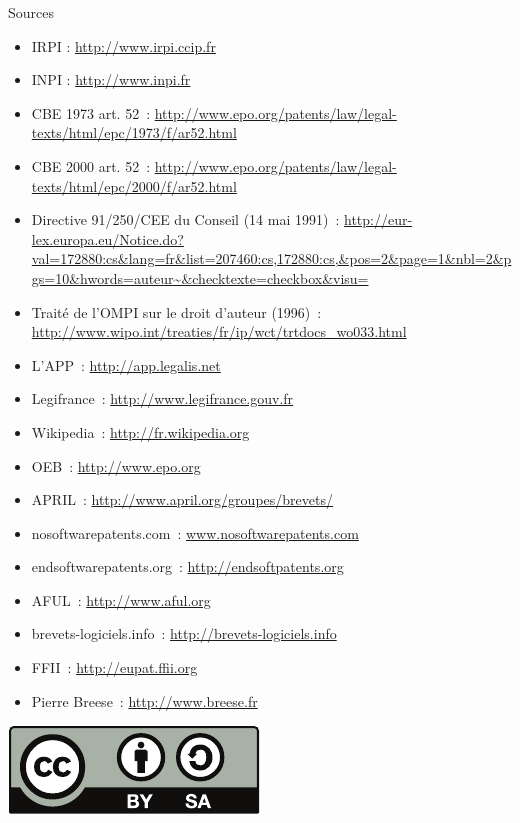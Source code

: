 \documentclass{beamer}
\begin{document}
\begin{frame}[allowframebreaks]{Sources}
    \begin{itemize}
        \item IRPI : \url{http://www.irpi.ccip.fr}
        \item INPI : \url{http://www.inpi.fr}
        \item CBE 1973 art. 52~: \url{http://www.epo.org/patents/law/legal-texts/html/epc/1973/f/ar52.html}
        \item CBE 2000 art. 52~: \url{http://www.epo.org/patents/law/legal-texts/html/epc/2000/f/ar52.html}
        \item Directive 91/250/CEE du Conseil (14 mai 1991)~: \url{http://eur-lex.europa.eu/Notice.do?val=172880:cs&lang=fr&list=207460:cs,172880:cs,&pos=2&page=1&nbl=2&pgs=10&hwords=auteur~&checktexte=checkbox&visu=}
        \item Traité de l’OMPI sur le droit d’auteur (1996)~: \url{http://www.wipo.int/treaties/fr/ip/wct/trtdocs_wo033.html}
        \item L'APP~: \url{http://app.legalis.net}
        \item Legifrance~: \url{http://www.legifrance.gouv.fr}
        \item Wikipedia~: \url{http://fr.wikipedia.org}
        \item OEB~: \url{http://www.epo.org}
        \item APRIL~: \url{http://www.april.org/groupes/brevets/}
        \item nosoftwarepatents.com~: \url{www.nosoftwarepatents.com}
        \item endsoftwarepatents.org~: \url{http://endsoftpatents.org}
        \item AFUL~: \url{http://www.aful.org}
        \item brevets-logiciels.info~: \url{http://brevets-logiciels.info}
        \item FFII~: \url{http://eupat.ffii.org}
        \item Pierre Breese~: \url{http://www.breese.fr}
    \end{itemize}
\end{frame}

\begin{frame}
    \begin{center}
        \href{http://creativecommons.org/licenses/by-sa/2.0/fr/}{\includegraphics[width=.40\linewidth]{images/cc_by_sa}}
    \end{center}
\end{frame}
\end{document}

